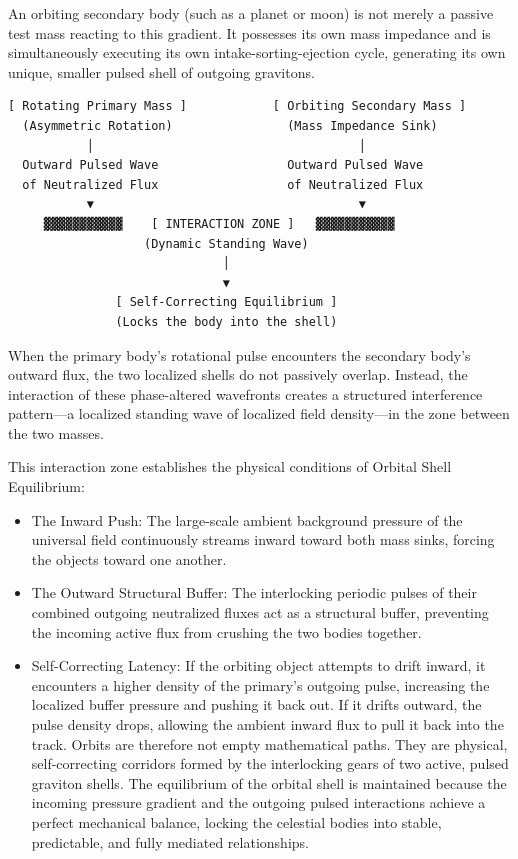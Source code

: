 \documentclass[11pt]{article}
\begin{document}
An orbiting secondary body (such as a planet or moon) is not merely a passive test mass reacting to this gradient. It possesses its own mass impedance and is simultaneously executing its own intake-sorting-ejection cycle, generating its own unique, smaller pulsed shell of outgoing gravitons.

\par\noindent\begin{minipage}{\linewidth}
\begin{verbatim}
[ Rotating Primary Mass ]            [ Orbiting Secondary Mass ]
  (Asymmetric Rotation)                (Mass Impedance Sink)
           │                                     │
  Outward Pulsed Wave                  Outward Pulsed Wave
  of Neutralized Flux                  of Neutralized Flux
           ▼                                     ▼
     ▓▓▓▓▓▓▓▓▓▓▓    [ INTERACTION ZONE ]   ▓▓▓▓▓▓▓▓▓▓▓
                   (Dynamic Standing Wave)
                              │
                              ▼
               [ Self-Correcting Equilibrium ]
               (Locks the body into the shell)
\end{verbatim}
\end{minipage}\par

When the primary body's rotational pulse encounters the secondary body's outward flux, the two localized shells do not passively overlap. Instead, the interaction of these phase-altered wavefronts creates a structured interference pattern---a localized standing wave of localized field density---in the zone between the two masses.

This interaction zone establishes the physical conditions of Orbital Shell Equilibrium:

\begin{itemize}
\item
  The Inward Push: The large-scale ambient background pressure of the universal field continuously streams inward toward both mass sinks, forcing the objects toward one another.
\item
  The Outward Structural Buffer: The interlocking periodic pulses of their combined outgoing neutralized fluxes act as a structural buffer, preventing the incoming active flux from crushing the two bodies together.
\item
  Self-Correcting Latency: If the orbiting object attempts to drift inward, it encounters a higher density of the primary's outgoing pulse, increasing the localized buffer pressure and pushing it back out. If it drifts outward, the pulse density drops, allowing the ambient inward flux to pull it back into the track. Orbits are therefore not empty mathematical paths. They are physical, self-correcting corridors formed by the interlocking gears of two active, pulsed graviton shells. The equilibrium of the orbital shell is maintained because the incoming pressure gradient and the outgoing pulsed interactions achieve a perfect mechanical balance, locking the celestial bodies into stable, predictable, and fully mediated relationships.
\end{itemize}
\end{document}
